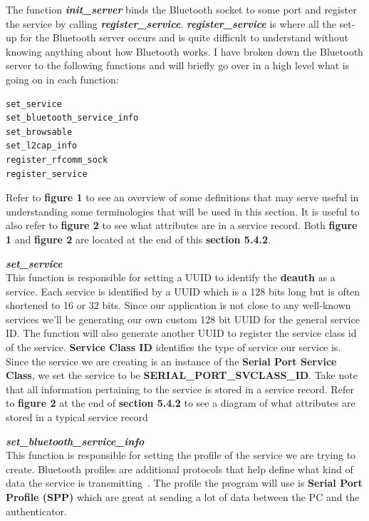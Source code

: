 \documentclass[letterpaper,twocolumn,10pt]{article}
\begin{document}
The function \textbf{\emph{init\_server}} binds the Bluetooth socket to some port and register the service by calling \textbf{\emph{register\_service}}. \textbf{\emph{register\_service}} is where all the set-up for the Bluetooth server occurs and is quite difficult to understand without knowing anything about how Bluetooth works. I have broken down the Bluetooth server to the following functions and will briefly go over in a high level what is going on in each function:
{\small
\begin{lstlisting}
set_service
set_bluetooth_service_info
set_browsable
set_l2cap_info
register_rfcomm_sock
register_service
\end{lstlisting}

Refer to \textbf{figure 1} to see an overview of some definitions that may serve useful in understanding some terminologies that will be used in this section. It is useful to also refer to \textbf{figure 2} to see what attributes are in a service record. Both \textbf{figure 1} and \textbf{figure 2} are located at the end of this \textbf{section 5.4.2}.

\hrulefill

\textbf{\emph{set\_service}}\\
This function is responsible for setting a UUID to identify the \textbf{deauth} as a service. Each service is identified by a UUID which is a 128 bits long but is often shortened to 16 or 32 bits. Since our application is not close to any well-known services we'll be generating our own custom 128 bit UUID for the general service ID. The function will also generate another UUID to register the service class id of the service. \textbf{Service Class ID} identifies the type of service our service is. Since the service we are creating is an instance of the \textbf{Serial Port Service Class}, we set the service to be \textbf{SERIAL\_PORT\_SVCLASS\_ID}. Take note that all information pertaining to the service is stored in a service record. Refer to \textbf{figure 2} at the end of \textbf{section 5.4.2} to see a diagram of what attributes are stored in a typical service record

\hrulefill

\textbf{\emph{set\_bluetooth\_service\_info}}\\
This function is responsible for setting the profile of the service we are trying to create. Bluetooth profiles are additional protocols that help define what kind of data the service is transmitting~\cite{bluetooth_basics}. The profile the program will use is \textbf{Serial Port Profile (SPP)} which are great at sending a lot of data between the PC and the authenticator.

}
\end{document}
